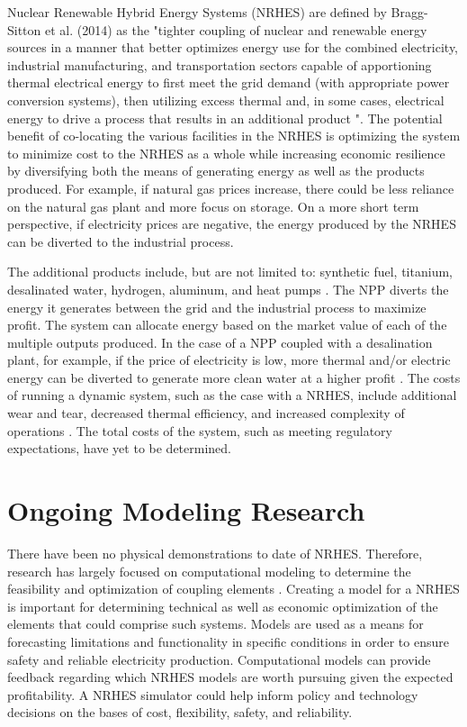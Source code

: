 \documentclass[12pt]{UIdahoMastersThesis}
\begin{document}
Nuclear Renewable Hybrid Energy Systems (NRHES) are defined by Bragg-Sitton et al. (2014) as the "tighter coupling of nuclear and renewable energy sources in a manner that better optimizes energy use for the combined electricity, industrial manufacturing, and transportation sectors capable of apportioning thermal electrical energy to first meet the grid demand (with appropriate power conversion systems), then utilizing excess thermal and, in some cases, electrical energy to drive a process that results in an additional product \cite {Bragg-Sitton2014}".  The potential benefit of co-locating the various facilities in the NRHES is optimizing the system to minimize cost to the NRHES as a whole while increasing economic resilience by diversifying both the means of generating energy as well as the products produced. For example, if natural gas prices increase, there could be less reliance on the natural gas plant and more focus on storage.  On a more short term perspective, if electricity prices are negative, the energy produced by the NRHES can be diverted to the industrial process.

The additional products include, but are not limited to: synthetic fuel, titanium, desalinated water, hydrogen, aluminum, and heat pumps \cite{Bienvenue2015}. The NPP diverts the energy it generates between the grid and the industrial process to maximize profit. The system can allocate energy based on the market value of each of the multiple outputs produced. In the case of a NPP coupled with a desalination plant, for example, if the price of electricity is low, more thermal and/or electric energy can be diverted to generate more clean water at a higher profit \cite {Chen2016}. The costs of running a dynamic system, such as the case with a NRHES, include additional wear and tear, decreased thermal efficiency, and increased complexity of operations \cite{Garcia2013}. The total costs of the system, such as meeting regulatory expectations, have yet to be determined.

\chapter{Ongoing Modeling Research}
There have been no physical demonstrations to date of NRHES. Therefore, research has largely focused on computational modeling to determine the feasibility and optimization of coupling elements \cite{Boardman2013, Shropshire2012}. Creating a model for a NRHES is important for determining technical as well as economic optimization of the elements that could comprise such systems. Models are used as a means for forecasting limitations and functionality in specific conditions in order to ensure safety and reliable electricity production. Computational models can provide feedback regarding which NRHES models are worth pursuing given the expected profitability. A NRHES simulator could help inform policy and technology decisions on the bases of cost, flexibility, safety, and reliability. 
\end{document}
